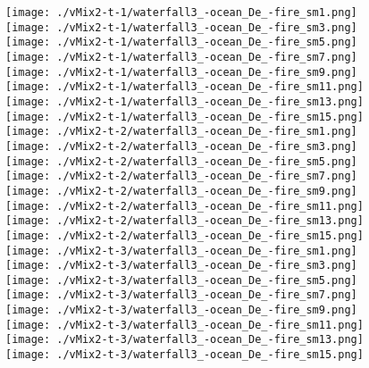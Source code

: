 \begin{figure}[ht!]
{\centering
    \texttt{[image: ./vMix2-t-1/waterfall3\_-ocean\_De\_-fire\_sm1.png]}
    \texttt{[image: ./vMix2-t-1/waterfall3\_-ocean\_De\_-fire\_sm3.png]}
    \texttt{[image: ./vMix2-t-1/waterfall3\_-ocean\_De\_-fire\_sm5.png]}
    \texttt{[image: ./vMix2-t-1/waterfall3\_-ocean\_De\_-fire\_sm7.png]}
    \texttt{[image: ./vMix2-t-1/waterfall3\_-ocean\_De\_-fire\_sm9.png]}
    \texttt{[image: ./vMix2-t-1/waterfall3\_-ocean\_De\_-fire\_sm11.png]}
    \texttt{[image: ./vMix2-t-1/waterfall3\_-ocean\_De\_-fire\_sm13.png]}
    \texttt{[image: ./vMix2-t-1/waterfall3\_-ocean\_De\_-fire\_sm15.png]} \\
\vspace{1mm}
    \texttt{[image: ./vMix2-t-2/waterfall3\_-ocean\_De\_-fire\_sm1.png]}
    \texttt{[image: ./vMix2-t-2/waterfall3\_-ocean\_De\_-fire\_sm3.png]}
    \texttt{[image: ./vMix2-t-2/waterfall3\_-ocean\_De\_-fire\_sm5.png]}
    \texttt{[image: ./vMix2-t-2/waterfall3\_-ocean\_De\_-fire\_sm7.png]}
    \texttt{[image: ./vMix2-t-2/waterfall3\_-ocean\_De\_-fire\_sm9.png]}
    \texttt{[image: ./vMix2-t-2/waterfall3\_-ocean\_De\_-fire\_sm11.png]}
    \texttt{[image: ./vMix2-t-2/waterfall3\_-ocean\_De\_-fire\_sm13.png]}
    \texttt{[image: ./vMix2-t-2/waterfall3\_-ocean\_De\_-fire\_sm15.png]} \\
\vspace{1mm}
    \texttt{[image: ./vMix2-t-3/waterfall3\_-ocean\_De\_-fire\_sm1.png]}
    \texttt{[image: ./vMix2-t-3/waterfall3\_-ocean\_De\_-fire\_sm3.png]}
    \texttt{[image: ./vMix2-t-3/waterfall3\_-ocean\_De\_-fire\_sm5.png]}
    \texttt{[image: ./vMix2-t-3/waterfall3\_-ocean\_De\_-fire\_sm7.png]}
    \texttt{[image: ./vMix2-t-3/waterfall3\_-ocean\_De\_-fire\_sm9.png]}
    \texttt{[image: ./vMix2-t-3/waterfall3\_-ocean\_De\_-fire\_sm11.png]}
    \texttt{[image: ./vMix2-t-3/waterfall3\_-ocean\_De\_-fire\_sm13.png]}
    \texttt{[image: ./vMix2-t-3/waterfall3\_-ocean\_De\_-fire\_sm15.png]} \\
\vspace{1mm}
}
\end{figure}
